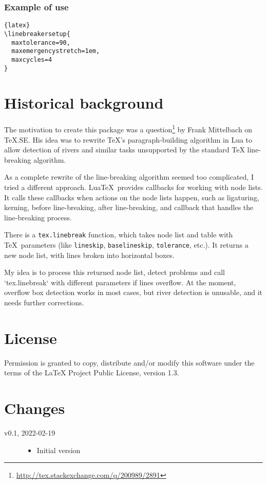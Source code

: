\documentclass{l3doc}
\begin{document}
\subsubsection{Example of \cmd{\linebreakersetup} use}

\begin{lstlisting}{latex}
\linebreakersetup{
  maxtolerance=90,
  maxemergencystretch=1em,
  maxcycles=4
}
\end{lstlisting}



\section{Historical background}

The motivation to create this package was a 
question\footnote{\url{http://tex.stackexchange.com/q/200989/2891}} by Frank Mittelbach on
TeX.SE. His idea was to rewrite TeX’s paragraph-building algorithm in Lua to
allow detection of rivers and similar tasks unsupported by the standard TeX
line-breaking algorithm.

As a complete rewrite of the line-breaking algorithm seemed too complicated, 
I tried a different approach. Lua\TeX\ provides  callbacks for working with node lists. 
It calls these callbacks when actions on the node lists happen, such as 
ligaturing, kerning, before line-breaking, after line-breaking, and 
callback that  handles the line-breaking process. 

There is a \verb|tex.linebreak| function, which takes
node list and table with \TeX\ parameters (like \verb|lineskip|, \verb|baselineskip|, \verb|tolerance|,
etc.). It returns a new node list, with lines broken into horizontal boxes.

My idea is to process this returned node list, detect problems and call
`tex.linebreak` with different parameters if lines overflow. At the
moment, overflow box detection works in most cases, but river detection is unusable, and it needs further corrections.

\section{License}

Permission is granted to copy, distribute and/or modify this software
under the terms of the LaTeX Project Public License, version 1.3.

\section{Changes}

\begin{description}
  \item[v0.1, 2022-02-19]
    \begin{itemize}
      \item Initial version
    \end{itemize}
\end{description}
\end{document}
